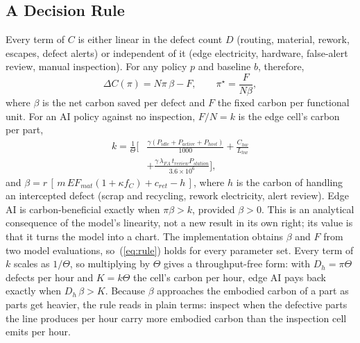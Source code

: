 \subsection{A Decision Rule}
Every term of $C$ is either linear in the defect count $D$ (routing, material, rework, escapes, defect alerts) or independent of it (edge electricity, hardware, false-alert review, manual inspection). For any policy $p$ and baseline $b$, therefore,
\begin{equation}
\Delta C(\pi) = N\pi\,\beta - F, \qquad \pi^\star = \frac{F}{N\beta},
\label{eq:rule}
\end{equation}
where $\beta$ is the net carbon saved per defect and $F$ the fixed carbon per functional unit. For an AI policy against no inspection, $F/N = k$ is the edge cell's carbon per part,
\begin{equation}
\begin{split}
k = \frac{1}{\Theta}\Big[&\frac{\gamma(P_{idle}+P_{active}+P_{host})}{1000} + \frac{C_{hw}}{L_{hw}} \\
&+ \frac{\gamma\,\lambda_{FA}\,t_{review}P_{station}}{3.6\times10^{6}}\Big],
\end{split}
\end{equation}
and $\beta = r\,[\,m\,EF_{mat}(1+\kappa f_C)+c_{ret}-h\,]$, where $h$ is the carbon of handling an intercepted defect (scrap and recycling, rework electricity, alert review). Edge AI is carbon-beneficial exactly when $\pi\beta>k$, provided $\beta>0$. This is an analytical consequence of the model's linearity, not a new result in its own right; its value is that it turns the model into a chart. The implementation obtains $\beta$ and $F$ from two model evaluations, so~(\ref{eq:rule}) holds for every parameter set. Every term of $k$ scales as $1/\Theta$, so multiplying by $\Theta$ gives a throughput-free form: with $D_h=\pi\Theta$ defects per hour and $K=k\Theta$ the cell's carbon per hour, edge AI pays back exactly when $D_h\,\beta>K$. Because $\beta$ approaches the embodied carbon of a part as parts get heavier, the rule reads in plain terms: inspect when the defective parts the line produces per hour carry more embodied carbon than the inspection cell emits per hour.

